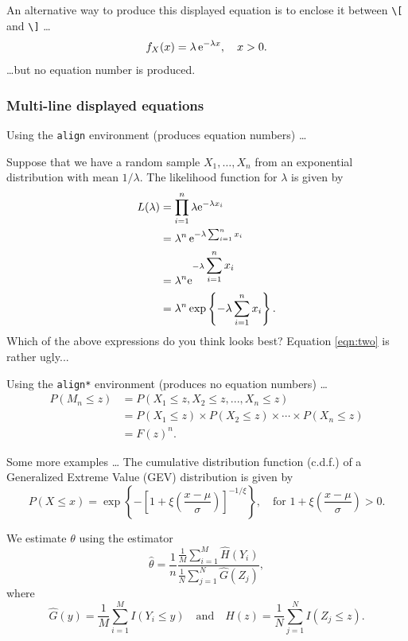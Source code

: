 \documentclass[a4paper,12pt,titlepage]{article} %
\let\leq=\leqslant   %
\numberwithin{equation}{section}  %
\begin{document}
An alternative way to produce this displayed equation is to enclose it between \verb!\[! and \verb!\]! \ldots
\[ f_X(x) = \lambda \, {\rm e}^{-\lambda x}, \quad x > 0.  \]
\ldots but no equation number is produced.

\subsubsection*{Multi-line displayed equations}
Using the \verb!align! environment (produces equation numbers) \ldots

Suppose that we have a random sample $X_1,\ldots,X_n$ from an exponential distribution with mean $1/\lambda$.
The likelihood function for $\lambda$ is given by
\begin{align}                                                                %
 L(\lambda) &= \prod_{i=1}^n \lambda \e^{-\lambda x_i} \notag \\             %
 &= \lambda^n \,\e^{-\lambda \sum_{i=1}^n x_i}  \\                           %
 &= \lambda^n \e^{-\lambda \displaystyle\sum_{i=1}^n x_i}  \label{eqn:two}\\ %
 &= \lambda^n \exp \left\{-\lambda \displaystyle\sum_{i=1}^n x_i \right\}.   %
\end{align}
Which of the above expressions do you think looks best?  Equation \eqref{eqn:two} is rather ugly...

Using the \verb!align*! environment (produces no equation numbers) \ldots
\begin{align*}                         %
P(M_n \leq z)&=P(X_1 \leq z,X_2 \leq z,...,X_n \leq z)  \\
    &=P(X_1 \leq z) \times P(X_2 \leq z) \times \cdots \times P(X_n \leq z) \\
    &={F(z)}^n.
\end{align*}

Some more examples \ldots
The cumulative distribution function (c.d.f.) of a Generalized Extreme Value (GEV) distribution is given by
\[ P(X \le x) = \exp\left\{ - \left[ 1+\xi\left(\frac{x-\mu}{\sigma}\right) \right]^{-1/\xi} \right\}, \quad \mbox{for~} 1+\xi\left(\frac{x-\mu}{\sigma}\right) > 0. \]

\newcommand{\disp}{\displaystyle}   %
\let\hat=\widehat                   %
We estimate $\theta$ using the estimator
\[ \widehat{\theta} = \disp\frac1n \frac{\disp\frac1M \disp\sum_{i=1}^M \hat{H}(Y_i)}{\disp\frac1N \disp\sum_{j=1}^N \hat{G}(Z_j)}, \]
where
\[ \hat{G}(y) = \frac1M \sum_{i=1}^M I(Y_i \leq y) \quad \mbox{and} \quad  \hat{H}(z) = \frac1N \sum_{j=1}^N I(Z_j \leq z). \]
\end{document}
